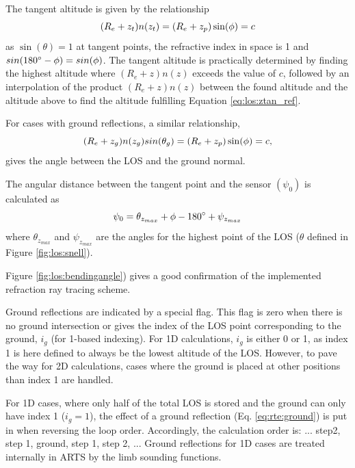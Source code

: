   The tangent altitude is given by the relationship
  \begin{equation}
    (R_e+z_t)n(z_t) = (R_e+z_p)\sin(\phi) = c
   \label{eq:los:ztan_ref}
  \end{equation}
  as $\sin(\theta)=1$ at tangent points, the refractive index in space
  is 1 and $sin(180^{\circ}-\phi)=sin(\phi)$. The tangent altitude
  is practically determined by finding the highest altitude where
  $(R_e+z)n(z)$ exceeds the value of $c$, followed by an interpolation
  of the product $(R_e+z)n(z)$ between the found altitude and the
  altitude above to find the altitude fulfilling Equation
  \ref{eq:los:ztan_ref}.
 
  For cases with ground reflections, a similar relationship,
  \begin{equation}
    (R_e+z_g)n(z_g)sin(\theta_g) = (R_e+z_p)\sin(\phi) = c,
  \end{equation}
  gives the angle between the LOS and the ground normal.

  The angular distance between the tangent point and the sensor $(\psi_0)$
  is calculated as
  \begin{equation}
    \psi_0 = \theta_{z_{max}} + \phi  - 180^\circ + \psi_{z_{max}}
  \end{equation}
  where $\theta_{z_{max}}$ and $\psi_{z_{max}}$ are the angles for the
  highest point of the LOS ($\theta$ defined in Figure \ref{fig:los:snell}).
  
  Figure \ref{fig:los:bendingangle}) gives a good confirmation of the
  implemented refraction ray tracing scheme.

  
  
  \label{sec:los:ground}
  
  Ground reflections are indicated by a special flag. This flag is
  zero when there is no ground intersection or gives the index of the
  LOS point corresponding to the ground, $i_g$ (for 1-based indexing).
  For 1D calculations, $i_g$ is either 0 or 1, as index 1 is here
  defined to always be the lowest altitude of the LOS. However, to
  pave the way for 2D calculations, cases where the ground is placed
  at other positions than index 1 are handled.
  
  For 1D cases, where only half of the total LOS is stored and the
  ground can only have index 1 ($i_g=1$), the effect of a ground
  reflection (Eq. \ref{eq:rte:ground}) is put in when reversing the
  loop order. Accordingly, the calculation order is: ... step2, step
  1, ground, step 1, step 2, ... Ground reflections for 1D cases are
  treated internally in ARTS by the limb sounding functions.
  
